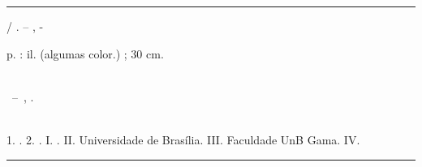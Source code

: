 \begin{fichacatalografica}
	\vspace*{\fill}					%
	\hrule							%
	\begin{center}					%
	\begin{minipage}[c]{12.5cm}		%
	
	\imprimirautor
	
	\hspace{0.5cm} \imprimirtitulo  / \imprimirautor. --
	\imprimirlocal, \imprimirdata-
	
	\hspace{0.5cm} \pageref{LastPage} p. : il. (algumas color.) ; 30 cm.\\
	
	\hspace{0.5cm} \imprimirorientadorRotulo~\imprimirorientador\\
	
	\hspace{0.5cm}
	\parbox[t]{\textwidth}{\imprimirtipotrabalho~--~\imprimirinstituicao,
	\imprimirdata.}\\
	
	\hspace{0.5cm}
		1. \imprimirpalavrachaveum.
		2. \imprimirpalavrachavedois.
		I. \imprimirorientador.
		II. Universidade de Brasília.
		III. Faculdade UnB Gama.
		IV. \imprimirtitulo\\ 			
	
	
	\end{minipage}
	\end{center}
	\hrule
\end{fichacatalografica}
